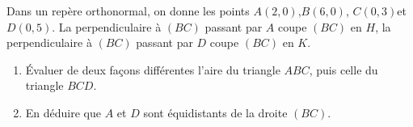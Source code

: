 
Dans un repère orthonormal, on donne les points $ A (2, 0)$,$ B (6, 0)$, $C (0, 3) $et $D ( 0, 5)$.
La perpendiculaire à $(BC)$ passant par $A$ coupe $(BC)$ en $H$, la perpendiculaire à $(BC)$ passant par $D$ coupe $(BC)$ en $K$.

\begin{enumerate}
\item Évaluer de deux façons différentes l'aire du triangle $ABC$, puis celle du triangle $BCD$.
\item En déduire que $A$ et $D$ sont équidistants de la droite $(BC)$.
\end{enumerate}

